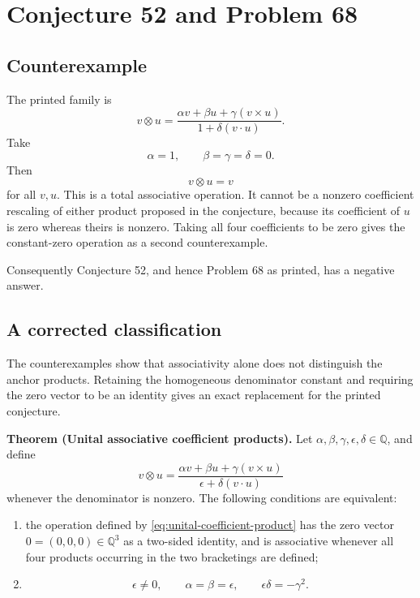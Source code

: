 \documentclass[11pt]{article}
\begin{document}
\clearpage
\section{Conjecture 52 and Problem 68}

\subsection{Counterexample}

The printed family is
\[
 v\otimes u=
 \frac{\alpha v+\beta u+\gamma(v\times u)}
      {1+\delta(v\mathbin{\cdot}u)}.
\]
Take
\[
 \alpha=1,\qquad\beta=\gamma=\delta=0.
\]
Then
\[
 v\otimes u=v
\]
for all \(v,u\).  This is a total associative operation.  It cannot be a
nonzero coefficient rescaling of either product proposed in the conjecture,
because its coefficient of \(u\) is zero whereas theirs is nonzero.  Taking
all four coefficients to be zero gives the constant-zero operation as a
second counterexample.

Consequently Conjecture 52, and hence Problem 68 as printed, has a negative
answer.

\subsection{A corrected classification}

The counterexamples show that associativity alone does not distinguish the
anchor products.  Retaining the homogeneous denominator constant and
requiring the zero vector to be an identity gives an exact replacement for
the printed conjecture.

\medskip
\noindent\textbf{Theorem (Unital associative coefficient products).}
Let \(\alpha,\beta,\gamma,\epsilon,\delta\in\mathbb Q\), and define
\begin{equation}
 v\otimes u=
 \frac{\alpha v+\beta u+\gamma(v\times u)}
      {\epsilon+\delta(v\mathbin{\cdot}u)}
\label{eq:unital-coefficient-product}
\end{equation}
whenever the denominator is nonzero.  The following conditions are
equivalent:
\begin{enumerate}
\item[(i)] the operation defined by
\eqref{eq:unital-coefficient-product} has the zero vector
\(0=(0,0,0)\in\mathbb Q^3\) as a two-sided identity, and is associative
whenever all four products occurring in the two bracketings are defined;
\item[(ii)]
\[
 \epsilon\ne0,\qquad \alpha=\beta=\epsilon,
 \qquad \epsilon\delta=-\gamma^2.
\]
\end{enumerate}
\end{document}
